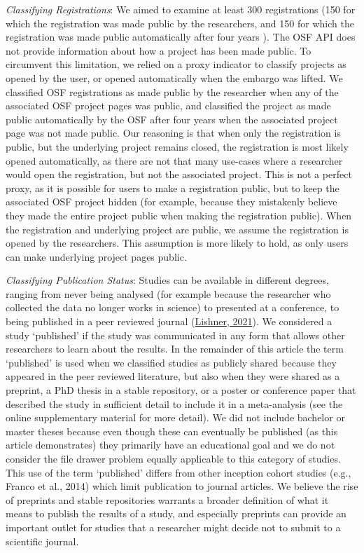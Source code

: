 \documentclass[
  ,jou, a4paper,floatsintext]{apa6}
\begin{document}
\emph{Classifying Registrations}: We aimed to examine at least 300 registrations (150 for which the registration was made public by the researchers, and 150 for which the registration was made public automatically after four years ). The OSF API does not provide information about how a project has been made public. To circumvent this limitation, we relied on a proxy indicator to classify projects as opened by the user, or opened automatically when the embargo was lifted. We classified OSF registrations as made public by the researcher when any of the associated OSF project pages was public, and classified the project as made public automatically by the OSF after four years when the associated project page was not made public. Our reasoning is that when only the registration is public, but the underlying project remains closed, the registration is most likely opened automatically, as there are not that many use-cases where a researcher would open the registration, but not the associated project. This is not a perfect proxy, as it is possible for users to make a registration public, but to keep the associated OSF project hidden (for example, because they mistakenly believe they made the entire project public when making the registration public). When the registration and underlying project are public, we assume the registration is opened by the researchers. This assumption is more likely to hold, as only users can make underlying project pages public.

\emph{Classifying Publication Status}: Studies can be available in different degrees, ranging from never being analysed (for example because the researcher who collected the data no longer works in science) to presented at a conference, to being published in a peer reviewed journal (\protect\hyperlink{ref-lishner_sorting_2021}{Lishner, 2021}). We considered a study `published' if the study was communicated in any form that allows other researchers to learn about the results. In the remainder of this article the term `published' is used when we classified studies as publicly shared because they appeared in the peer reviewed literature, but also when they were shared as a preprint, a PhD thesis in a stable repository, or a poster or conference paper that described the study in sufficient detail to include it in a meta-analysis (see the online supplementary material for more detail). We did not include bachelor or master theses because even though these can eventually be published (as this article demonstrates) they primarily have an educational goal and we do not consider the file drawer problem equally applicable to this category of studies. This use of the term `published' differs from other inception cohort studies (e.g., Franco et al., 2014) which limit publication to journal articles. We believe the rise of preprints and stable repositories warrants a broader definition of what it means to publish the results of a study, and especially preprints can provide an important outlet for studies that a researcher might decide not to submit to a scientific journal.
\end{document}
